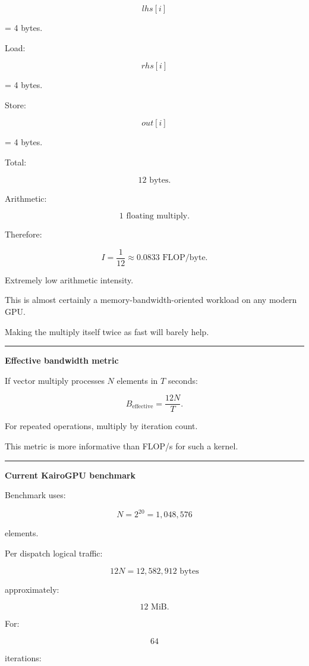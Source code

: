 \[
lhs[i]
\]

= 4 bytes.

Load:

\[
rhs[i]
\]

= 4 bytes.

Store:

\[
out[i]
\]

= 4 bytes.

Total:

\[
12\text{ bytes}.
\]

Arithmetic:

\[
1\text{ floating multiply}.
\]

Therefore:

\[
\boxed{
I=
\frac1{12}
\approx0.0833
\text{ FLOP/byte}.
}
\]

Extremely low arithmetic intensity.

This is almost certainly a memory-bandwidth-oriented workload on any modern GPU.

Making the multiply itself twice as fast will barely help.

\begin{center}\rule{0.5\linewidth}{0.5pt}\end{center}

\textbf{Effective bandwidth metric}

If vector multiply processes \(N\) elements in \(T\) seconds:

\[
\boxed{
B_{\text{effective}}
=
\frac{
12N
}{
T
}.
}
\]

For repeated operations, multiply by iteration count.

This metric is more informative than FLOP/s for such a kernel.

\begin{center}\rule{0.5\linewidth}{0.5pt}\end{center}

\textbf{Current KairoGPU benchmark}

Benchmark uses:

\[
N=2^{20}
=
1,048,576
\]

elements.

Per dispatch logical traffic:

\[
12N
=
12,582,912\text{ bytes}
\]

approximately:

\[
12\text{ MiB}.
\]

For:

\[
64
\]

iterations:

